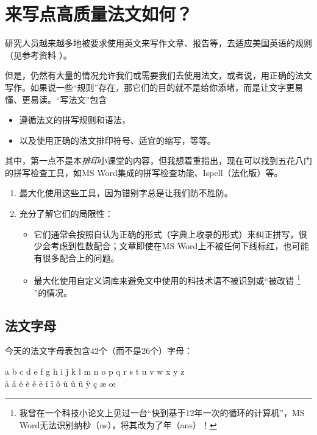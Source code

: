 \chapter{来写点高质量法文如何？}

研究人员越来越多地被要求使用英文来写作文章、报告等，去适应美国英语的规则（见参考资料%
）。

但是，仍然有大量的情况允许我们或需要我们去使用法文，或者说，用正确的法文写作。如果说一些``规则''存在，那它们的目的就不是给你添堵，而是让文字更易懂、更易读。``写法文''包含

\begin{itemize}
    \item 遵循法文的拼写规则和语法，
    \item 以及使用正确的法文排印符号、适宜的缩写，等等。
\end{itemize}

其中，第一点不是本\emph{排印}小课堂的内容，但我想着重指出，现在可以找到五花八门的拼写检查工具，如MS Word集成的拼写检查功能、Ispell（法化版）等。

\begin{enumerate}
    \item 最大化使用这些工具，因为错别字总是让我们防不胜防。
    \item 充分了解它们的局限性：
    \begin{itemize}
        \item 它们通常会按照自认为正确的形式（字典上收录的形式）来纠正拼写，很少会考虑到性数配合；文章即使在MS Word上不被任何下线标红，也可能有很多配合上的问题。
        \item 最大化使用自定义词库来避免文中使用的科技术语不被识别或``被改错
            \footnote{我曾在一个科技小论文上见过一台``快到基于12年一次的循环的计算机''，MS Word无法识别纳秒（ns），将其改为了年（ans）！}
        ''的情况。
    \end{itemize}
\end{enumerate}

\section{法文字母}

今天的法文字母表包含42个（而不是26个）字母：

\begin{center}
    \Large a b c d e f g h i j k l m n o p q r s t u v w x y z \\
    à â é è ê ë î ï ô ù û ü ÿ ç æ œ
\end{center}

